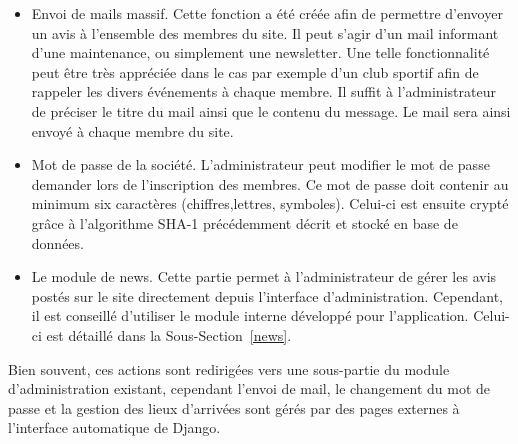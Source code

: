 \documentclass[12pt, a4paper, oneside]{article}
\begin{document}
\begin{itemize}
        \item Envoi de mails massif. Cette fonction a été créée afin de permettre d'envoyer un avis à l'ensemble des membres du site. Il peut s'agir d'un mail informant d'une maintenance, ou simplement une newsletter. Une telle fonctionnalité peut être très appréciée dans le cas par exemple d'un club sportif afin de rappeler les divers événements à chaque membre. Il suffit à l'administrateur de préciser le titre du mail ainsi que le contenu du message. Le mail sera ainsi envoyé à chaque membre du site.\\
        \item Mot de passe de la société. L'administrateur peut modifier le mot de passe demander lors de l'inscription des membres. Ce mot de passe doit contenir au minimum six caractères (chiffres,lettres, symboles). Celui-ci est ensuite crypté grâce à l'algorithme  SHA-1 précédemment décrit et stocké en base de données.\\
        \item Le module de news. Cette partie permet à l'administrateur de gérer les avis postés sur le site directement depuis l'interface d'administration. Cependant, il est conseillé d'utiliser le module interne développé pour l'application. Celui-ci est détaillé dans la Sous-Section~\ref{news}.\\
    \end{itemize}
    Bien souvent, ces actions sont redirigées vers une sous-partie du module d'administration existant, cependant l'envoi de mail, le changement du mot de passe et la gestion des lieux d'arrivées sont gérés par des pages externes à l'interface automatique de Django.
     
\end{document}
